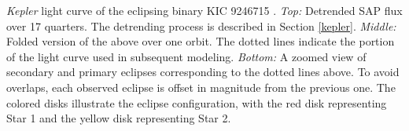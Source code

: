 \label{fig:keplerfig} \emph{Kepler} light curve of the eclipsing binary KIC 9246715 . \emph{Top:} Detrended SAP flux over 17 quarters. The detrending process is described in Section \ref{kepler}. \emph{Middle:} Folded version of the above over one orbit. The dotted lines indicate the portion of the light curve used in subsequent modeling. \emph{Bottom:} A zoomed view of secondary and primary eclipses corresponding to the dotted lines above. To avoid overlaps, each observed eclipse is offset in magnitude from the previous one. The colored disks illustrate the eclipse configuration, with the red disk representing Star 1 and the yellow disk representing Star 2.
